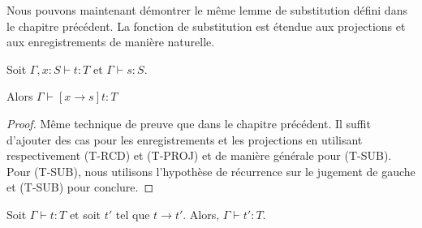 Nous pouvons maintenant démontrer le même lemme de substitution défini dans le
chapitre précédent. La fonction de substitution est étendue aux projections et
aux enregistrements de manière naturelle.

\begin{lemma} 
  \label{lemma:subtyping-record-substitution}
  Soit $\Gamma, x : S \vdash t : T$ et $\Gamma \vdash s : S$.

  Alors $\Gamma \vdash [x \rightarrow s] t : T$
\end{lemma}

\begin{proof}
  Même technique de preuve que dans le chapitre précédent. Il suffit d'ajouter 
  des cas pour les enregistrements et les projections en utilisant
  respectivement (T-RCD) et (T-PROJ) et de manière générale pour (T-SUB). Pour
  (T-SUB), nous utilisons l'hypothèse de récurrence sur le jugement de gauche et
(T-SUB) pour conclure.
\end{proof}

\begin{theorem} 
  Soit $\Gamma \vdash t : T$ et soit $t'$ tel que $t \rightarrow t'$. Alors,
  $\Gamma \vdash t' : T$.
\end{theorem}


